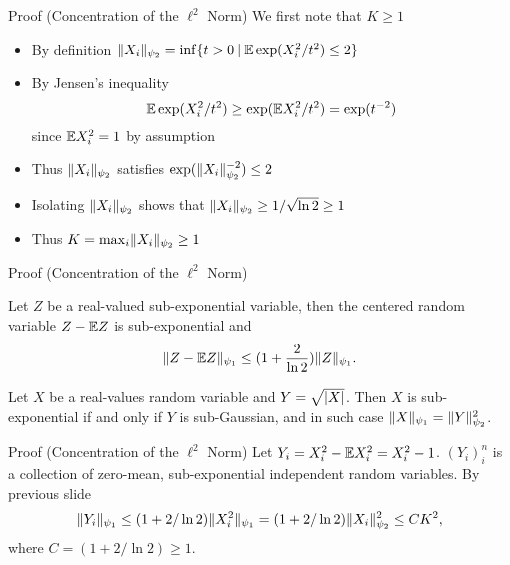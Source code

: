 \documentclass{beamer}
\begin{document}
  \begin{frame}{Proof (Concentration of the \(\ell^{2}\) Norm)}
    We first note that \(K \geq 1\)\pause
    \begin{itemize}
      \item By definition
        \(\lVert X_{i}\rVert_{\psi_{2}} = \inf\{t > 0 \: | \: \mathbb{E}\exp(X_{i}^{2} / t^{2}) \leq 2\}\)\pause
      \item
        By Jensen's inequality
        \begin{equation}
          \mathbb{E} \exp(X_{i}^{2} / t^{2}) \geq \exp(\mathbb{E} X_{i}^{2} / t^{2}) = \exp(t^{-2})
        \end{equation}
        since \(\mathbb{E} X_{i}^{2} = 1\) by assumption\pause
      \item Thus \(\lVert X_{i}\rVert_{\psi_{2}}\) satisfies
        \(\exp(\lVert X_{i}\rVert_{\psi_{2}}^{-2}) \leq 2\) \pause
      \item Isolating \(\lVert X_{i}\rVert_{\psi_2}\) shows that
        \(\lVert X_{i}\rVert_{\psi_{2}} \geq 1 / \sqrt{\ln 2} \geq 1\)\pause
      \item Thus \(K = \max_{i}\lVert X_{i}\rVert_{\psi_{2}} \geq 1\)
    \end{itemize}
  \end{frame}

  \begin{frame}{Proof (Concentration of the \(\ell^{2}\) Norm)}
    \begin{proposition}
      \label{prop:centering-of-sub-exp-rvs}
      Let \(Z\) be a real-valued sub-exponential variable, then the centered random
      variable \(Z - \mathbb{E} Z\) is sub-exponential and
      \begin{equation}
        \lVert Z - \mathbb{E} Z\rVert_{\psi_{1}} \leq (1 + \frac{2}{\ln 2}) \lVert Z\rVert_{\psi_{1}}.
      \end{equation}
    \end{proposition}
    
    \begin{proposition}
      \label{prop:sub-gauss-sub-exp-norm-relation}
      Let \(X\) be a real-values random variable and \(Y = \sqrt{\lvert X\rvert}\). Then
      \(X\) is sub-exponential if and only if \(Y\) is sub-Gaussian, and in such
      case \(\lVert X\rVert_{\psi_{1}} = \lVert Y\rVert_{\psi_{2}}^{2}\).
    \end{proposition}
  \end{frame}

  \begin{frame}{Proof (Concentration of the \(\ell^{2}\) Norm)}
    Let \(Y_{i} = X_{i}^{2} - \mathbb{E} X_{i}^{2} = X_{i}^{2} - 1\). \pause
    \((Y_{i})_{i}^{n}\) is a collection of
    zero-mean, sub-exponential independent random variables. \pause By previous
    slide
    \begin{equation}
      \lVert Y_{i}\rVert_{\psi_{1}} \leq (1 + 2 / \ln 2)\lVert X_{i}^{2}\rVert_{\psi_{1}} = (1 + 2 / \ln 2)\lVert X_{i}\rVert_{\psi_{2}}^{2} \leq C K^{2},
    \end{equation}
    where \(C = (1 + 2 / \ln 2) \geq 1\).
  \end{frame}
\end{document}
